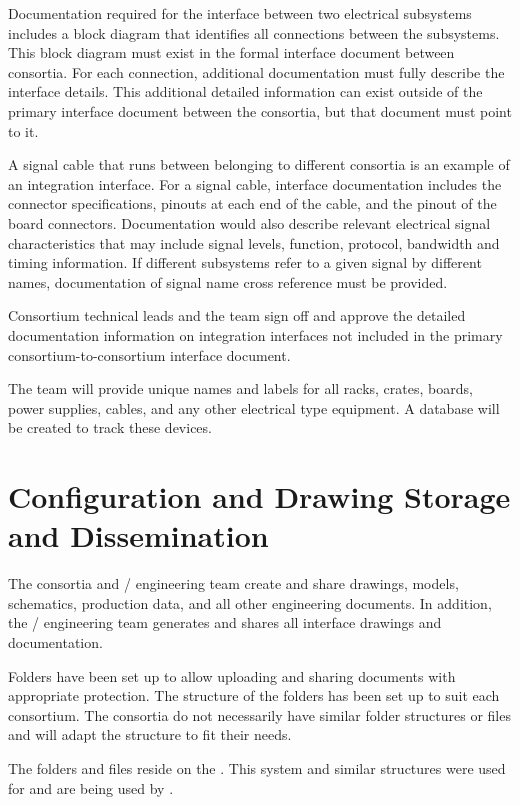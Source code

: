 Documentation required for the interface between two electrical
subsystems includes a block diagram that identifies all connections
between the subsystems.  This block diagram must exist in the formal
interface document between consortia.  For each connection, additional
documentation must fully describe the interface details. This
additional detailed information can exist outside of the primary
interface document between the consortia, but that document must point
to it.


A signal cable that runs between  belonging to different
consortia is an example of an integration interface.  For a signal
cable, interface documentation includes the connector specifications,
pinouts at each end of the cable, and the pinout of the board
connectors.  Documentation would also describe relevant electrical
signal characteristics that may include signal levels, function,
protocol, bandwidth and timing information.  If different subsystems
refer to a given signal by different names, documentation of signal
name cross reference must be provided.

Consortium technical leads and the  team sign off
and approve the detailed documentation information on integration
interfaces not included in the primary consortium-to-consortium
interface document.

The  team will provide unique names and labels
for all racks, crates, boards, power supplies, cables, and any other
electrical type equipment.  A database will be created to track these
devices.

\section{Configuration and Drawing Storage and Dissemination}
\label{sec:fdsp-coord-integ-modelplan}

The consortia and / engineering team create and share
drawings, models, schematics, production data, and all other
engineering documents. In addition, the / engineering team
generates and shares all interface drawings and documentation.

Folders have been set up to allow uploading and sharing documents
with appropriate protection. The structure of the folders has been set
up to suit each consortium. The consortia do not necessarily have
similar folder structures or files  and will adapt the structure to fit
their needs.

The folders and files reside on the . This system and
similar structures were used for  and are being
used by .

